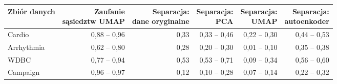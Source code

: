 \begin{tabular}{lrrrrr}
\toprule
Zbiór danych & \makecell[r]{Zaufanie\\sąsiedztw UMAP} & \makecell[r]{Separacja:\\dane oryginalne} & \makecell[r]{Separacja:\\PCA} & \makecell[r]{Separacja:\\UMAP} & \makecell[r]{Separacja:\\autoenkoder} \\
\midrule
Cardio & 0,88 -- 0,96 & 0,33 & 0,33 -- 0,46 & 0,22 -- 0,30 & 0,44 -- 0,53 \\
Arrhythmia & 0,62 -- 0,80 & 0,28 & 0,20 -- 0,30 & 0,01 -- 0,10 & 0,35 -- 0,38 \\
WDBC & 0,77 -- 0,94 & 0,53 & 0,53 -- 0,71 & 0,09 -- 0,34 & 0,56 -- 0,60 \\
Campaign & 0,96 -- 0,97 & 0,12 & 0,10 -- 0,28 & 0,07 -- 0,14 & 0,22 -- 0,32 \\
\bottomrule
\end{tabular}
